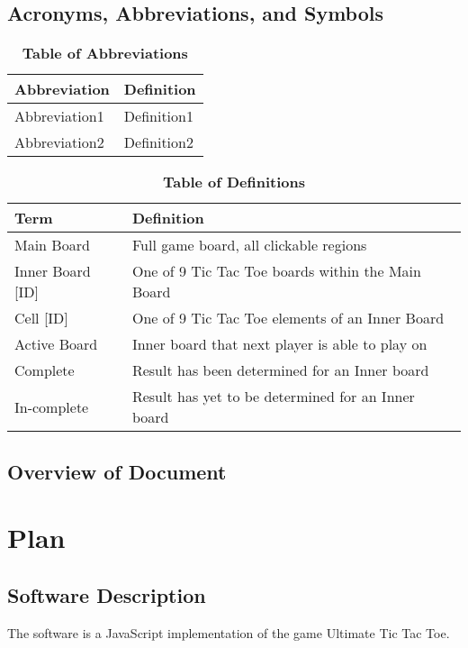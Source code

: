 \documentclass[12pt, titlepage]{article}
\begin{document}
\subsection{Acronyms, Abbreviations, and Symbols}
	
\begin{table}[hbp]
\caption{\textbf{Table of Abbreviations}} \label{Table}

\begin{tabularx}{\textwidth}{p{3cm}X}
\toprule
\textbf{Abbreviation} & \textbf{Definition} \\
\midrule
Abbreviation1 & Definition1\\
Abbreviation2 & Definition2\\
\bottomrule
\end{tabularx}

\end{table}

\begin{table}[!htbp]
\caption{\textbf{Table of Definitions}} \label{Table}

\begin{tabularx}{\textwidth}{p{3cm}X}
\toprule
\textbf{Term} & \textbf{Definition}\\
\midrule
Main Board & Full game board, all clickable regions \\
Inner Board [ID] & One of 9 Tic Tac Toe boards within the Main Board\\
Cell [ID] & One of 9 Tic Tac Toe elements of an Inner Board\\
Active Board & Inner board that next player is able to play on\\
Complete & Result has been determined for an Inner board \\
In-complete & Result has yet to be determined for an Inner board \\
\bottomrule
\end{tabularx}

\end{table}	

\subsection{Overview of Document}

\section{Plan}
	
\subsection{Software Description}
The software is a JavaScript implementation of the game Ultimate Tic Tac Toe. 
\end{document}
